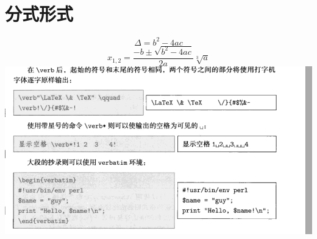\documentclass[UTF8]{ctexart}
\begin{document}
\section{分式形式}
\begin{equation}
\Delta = b^2 - 4ac
\end{equation}
\begin{equation}x_{1,2} = \frac{-b \pm \sqrt{b^2 - 4ac}}{2a}\sqrt[3]{a}\end{equation}
\includegraphics[scale = 0.3]{001.png}%
\end{document}
